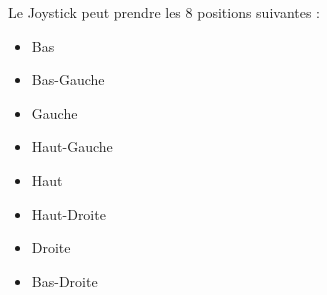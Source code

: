 \documentclass[TP, noCustomPackages]{UPSTI_Document}
\begin{document}
\begin{UPSTIactivite}
    Le Joystick peut prendre les 8 positions suivantes : 
    \begin{multicols}{4}
        \begin{itemize}
            \item Bas
            \item Bas-Gauche
            \item Gauche
            \item Haut-Gauche
            \item Haut
            \item Haut-Droite
            \item Droite
            \item Bas-Droite
        \end{itemize}
    \end{multicols}
   
\end{UPSTIactivite}
\end{document}
